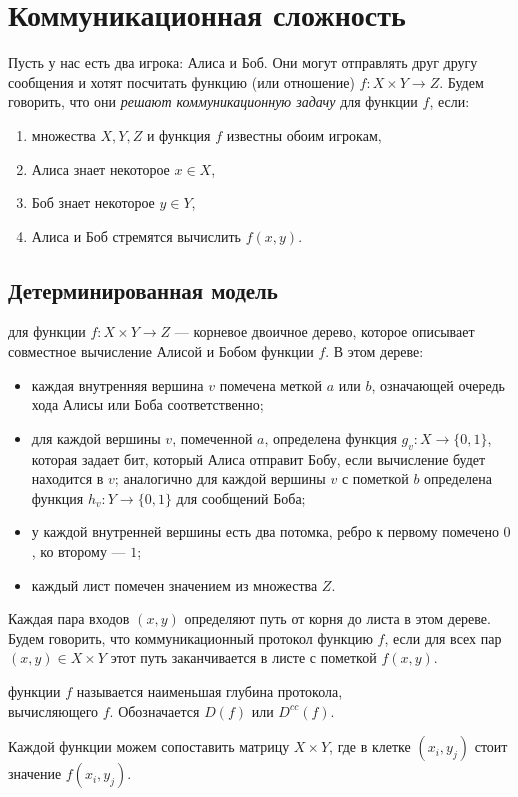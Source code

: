 \chapter{Коммуникационная сложность}
Пусть у нас есть два игрока: Алиса и Боб. Они могут отправлять друг другу сообщения и хотят посчитать функцию (или отношение) $ f \colon X \times Y \to Z$.
Будем говорить, что они \textit{решают коммуникационную задачу} для функции $ f$, если:
\begin{enumerate}
	\item множества $ X, Y, Z$ и функция $ f$ известны обоим игрокам,
	\item	Алиса знает некоторое $x \in  X$,
	\item	Боб знает некоторое $ y \in Y$,
	\item	Алиса и Боб стремятся вычислить $ f(x, y)$.
\end{enumerate}

\section{Детерминированная модель}
\begin{defn}
	 для функции $ f\colon X\times Y \to  Z$ --- корневое двоичное дерево, которое описывает совместное вычисление Алисой и Бобом функции $ f$. В этом дереве:
	   \begin{itemize}
		   \item каждая внутренняя вершина $ v$ помечена меткой $ a$ или $ b$, означающей очередь хода Алисы или Боба соответственно;
		   \item для каждой вершины $ v$, помеченной $ a$, определена функция  $ g_v\colon X \to \{0, 1\}$, которая задает бит, который Алиса отправит  Бобу, если вычисление будет находится в $ v$; аналогично для каждой вершины $ v$ с пометкой $ b$ определена функция  $ h_v\colon Y \to \{0, 1\}$ для сообщений Боба;
		\item у каждой внутренней вершины есть два потомка, ребро к первому помечено $ 0$, ко второму --- $ 1$;
		\item каждый лист помечен значением из множества $ Z$.
	   \end{itemize}
	   Каждая пара входов $ (x, y)$ определяют путь от корня до листа в этом дереве. 
	   Будем  говорить, что коммуникационный протокол  функцию $ f$, если для всех пар  $ (x, y) \in  X \times Y$ этот путь заканчивается в листе с пометкой $ f(x, y)$.

	    функции $ f$ называется наименьшая глубина протокола, \\вычисляющего  $ f$. Обозначается  $ D(f)$ или $ D^{cc}(f)$.

	   Каждой функции можем сопоставить матрицу  $ X \times Y$, где в клетке $ (x_i, y_j)$ стоит значение  $ f(x_i, y_j)$.
\end{defn}

